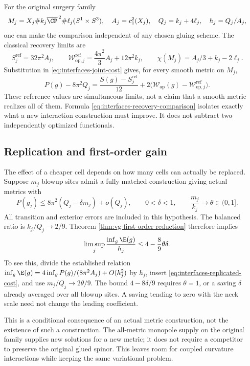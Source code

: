 For the original surgery family
\[
 M_j=X_j\# k_j\overline{\CP}^{\,2}\#\ell_j(S^1\times S^3),
 \quad A_j=c_1^2(X_j),\quad Q_j=k_j+4\ell_j,
 \quad h_j=Q_j/A_j,
\]
one can make the comparison independent of any chosen gluing scheme.
The classical recovery limits are
\[
 S_j^{\mathrm{ref}}=32\pi^2A_j,\qquad
 \mathcal W_{\mathrm{op},j}^{\mathrm{ref}}
       =\frac{4\pi^2}{3}A_j+12\pi^2k_j,
 \qquad \chi(M_j)=A_j/3+k_j-2\ell_j.
\]
Substitution in \eqref{eq:interfaces-joint-cost} gives, for every
smooth metric on $M_j$,
\begin{equation}\label{eq:interfaces-recovery-comparison}
 P(g)-8\pi^2Q_j
  =\frac{S(g)-S_j^{\mathrm{ref}}}{12}
   +2\bigl(\mathcal W_{\mathrm{op}}(g)
                 -\mathcal W_{\mathrm{op},j}^{\mathrm{ref}}\bigr).
\end{equation}
These reference values are simultaneous limits, not a claim that a
smooth metric realizes all of them. Formula
\eqref{eq:interfaces-recovery-comparison} isolates exactly what a
new interaction construction must improve. It does not subtract two
independently optimized functionals.

\subsection{Replication and first-order gain}
The effect of a cheaper cell depends on how many cells can actually be
replaced. Suppose $m_j$ blowup sites admit a fully matched construction
giving actual metrics with
\begin{equation}\label{eq:interfaces-replicated-cost}
 P(g_j)\le8\pi^2(Q_j-\delta m_j)+o(Q_j),
 \qquad 0<\delta<1,
 \qquad \frac{m_j}{k_j}\longrightarrow\theta\in(0,1].
\end{equation}
All transition and exterior errors are included in this hypothesis.
The balanced ratio is $k_j/Q_j\to2/9$. Theorem
\ref{thm:vg-first-order-reduction} therefore implies
\begin{equation}\label{eq:interfaces-replication-fraction}
 \limsup_j\frac{\inf_g\E(g)}{h_j}
     \le4-\frac89\theta\delta.
\end{equation}
To see this, divide the established relation
$\inf_g\E(g)=4\inf_gP(g)/(8\pi^2A_j)+O(h_j^2)$ by $h_j$,
insert \eqref{eq:interfaces-replicated-cost}, and use
$m_j/Q_j\to2\theta/9$. The bound $4-8\delta/9$ requires
$\theta=1$, or a saving $\delta$ already averaged over all blowup
sites. A saving tending to zero with the neck scale need not change
the leading coefficient.

This is a conditional consequence of an actual metric construction,
not the existence of such a construction. The all-metric monopole
supply on the original family supplies new solutions for a new metric;
it does not require a competitor to preserve the original glued
spinor. This leaves room for coupled curvature interactions while
keeping the same variational problem.


